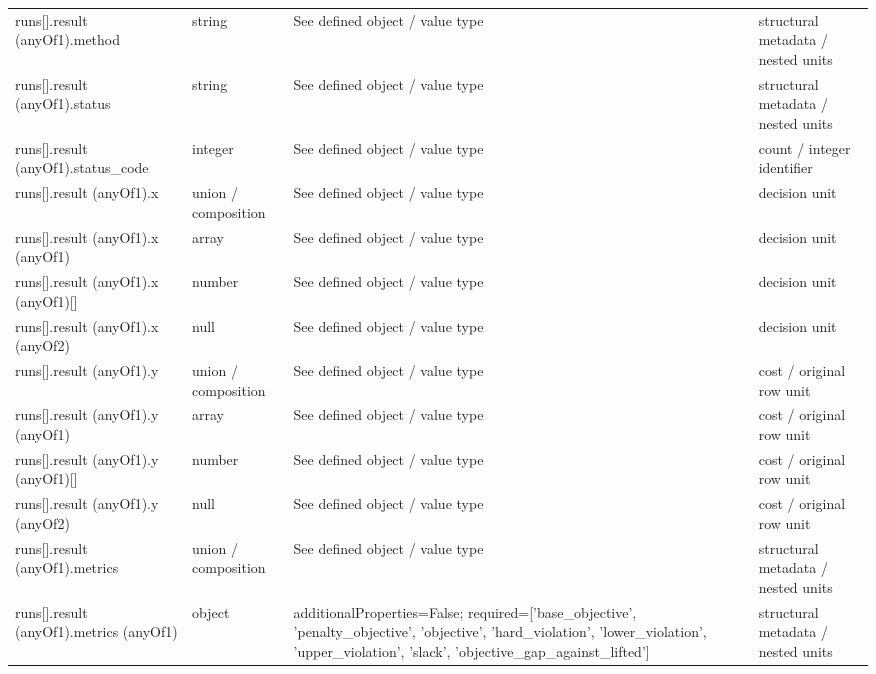 \begin{longtable}{@{}>{\raggedright\arraybackslash}p{}>{\raggedright\arraybackslash}p{}>{\raggedright\arraybackslash}p{}>{\raggedright\arraybackslash}p{}@{}}
runs[].\allowbreak{}result (anyOf1).\allowbreak{}method & string & See defined object /\allowbreak{} value type & structural metadata /\allowbreak{} nested units\\
runs[].\allowbreak{}result (anyOf1).\allowbreak{}status & string & See defined object /\allowbreak{} value type & structural metadata /\allowbreak{} nested units\\
runs[].\allowbreak{}result (anyOf1).\allowbreak{}status\_\allowbreak{}code & integer & See defined object /\allowbreak{} value type & count /\allowbreak{} integer identifier\\
runs[].\allowbreak{}result (anyOf1).\allowbreak{}x & union /\allowbreak{} composition & See defined object /\allowbreak{} value type & decision unit\\
runs[].\allowbreak{}result (anyOf1).\allowbreak{}x (anyOf1) & array & See defined object /\allowbreak{} value type & decision unit\\
runs[].\allowbreak{}result (anyOf1).\allowbreak{}x (anyOf1)[] & number & See defined object /\allowbreak{} value type & decision unit\\
runs[].\allowbreak{}result (anyOf1).\allowbreak{}x (anyOf2) & null & See defined object /\allowbreak{} value type & decision unit\\
runs[].\allowbreak{}result (anyOf1).\allowbreak{}y & union /\allowbreak{} composition & See defined object /\allowbreak{} value type & cost /\allowbreak{} original row unit\\
runs[].\allowbreak{}result (anyOf1).\allowbreak{}y (anyOf1) & array & See defined object /\allowbreak{} value type & cost /\allowbreak{} original row unit\\
runs[].\allowbreak{}result (anyOf1).\allowbreak{}y (anyOf1)[] & number & See defined object /\allowbreak{} value type & cost /\allowbreak{} original row unit\\
runs[].\allowbreak{}result (anyOf1).\allowbreak{}y (anyOf2) & null & See defined object /\allowbreak{} value type & cost /\allowbreak{} original row unit\\
runs[].\allowbreak{}result (anyOf1).\allowbreak{}metrics & union /\allowbreak{} composition & See defined object /\allowbreak{} value type & structural metadata /\allowbreak{} nested units\\
runs[].\allowbreak{}result (anyOf1).\allowbreak{}metrics (anyOf1) & object & additionalProperties=\allowbreak{}False; required=\allowbreak{}['base\_\allowbreak{}objective', 'penalty\_\allowbreak{}objective', 'objective', 'hard\_\allowbreak{}violation', 'lower\_\allowbreak{}violation', 'upper\_\allowbreak{}violation', 'slack', 'objective\_\allowbreak{}gap\_\allowbreak{}against\_\allowbreak{}lifted'] & structural metadata /\allowbreak{} nested units\\

\end{longtable}
